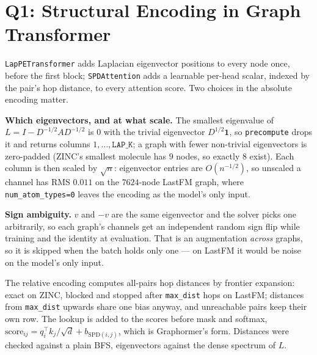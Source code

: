 \section{Q1: Structural Encoding in Graph Transformer}

\texttt{LapPETransformer} adds Laplacian eigenvector positions to every node once, before the
first block; \texttt{SPDAttention} adds a learnable per-head scalar, indexed by the pair's hop
distance, to every attention score. Two choices in the absolute encoding matter.

\textbf{Which eigenvectors, and at what scale.} The smallest eigenvalue of
$L = I - D^{-1/2} A D^{-1/2}$ is $0$ with the trivial eigenvector $D^{1/2}\mathbf{1}$, so
\texttt{precompute} drops it and returns columns
$1,\dots,\texttt{LAP\_K}$; a graph with fewer non-trivial eigenvectors is zero-padded (ZINC's
smallest molecule has $9$ nodes, so exactly $8$ exist). Each column is then scaled by $\sqrt{n}$:
eigenvector entries are $O(n^{-1/2})$, so unscaled a channel has RMS $0.011$ on the $7624$-node
LastFM graph, where \texttt{num\_atom\_types=0} leaves the encoding as the model's only input.

\textbf{Sign ambiguity.} $v$ and $-v$ are the same eigenvector and the solver picks one
arbitrarily, so each graph's channels get an independent random sign flip while training and the
identity at evaluation. That is an augmentation \emph{across} graphs, so it is skipped when the
batch holds only one --- on LastFM it would be noise on the model's only input.

The relative encoding computes all-pairs hop distances by frontier expansion: exact on ZINC,
blocked and stopped after \texttt{max\_dist} hops on LastFM; distances from \texttt{max\_dist}
upwards share one bias anyway, and unreachable pairs keep their own row. The lookup is added to
the scores before mask and softmax,
$\mathrm{score}_{ij} = q_i^\top k_j/\sqrt{d} + b_{\mathrm{SPD}(i,j)}$, which is Graphormer's
form. Distances were checked against a plain BFS, eigenvectors against the dense spectrum of
$L$.

